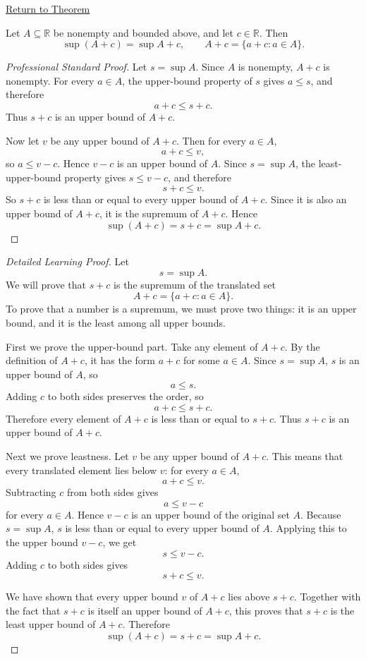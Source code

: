 \newpage
{}
\label{prf:translation-invariance-supremum}

\begin{remark*}[Return]
\hyperref[thm:translation-invariance-supremum]{Return to Theorem}
\end{remark*}

\begin{theorem*}
Let $A\subseteq\mathbb{R}$ be nonempty and bounded above, and let $c\in\mathbb{R}$. Then
\[
  \sup(A+c)=\sup A+c,
  \qquad
  A+c=\{a+c:a\in A\}.
\]
\end{theorem*}

\begin{proof}[Professional Standard Proof]
\LRAProofBodyStart
Let \(s=\sup A\). Since \(A\) is nonempty, \(A+c\) is nonempty. For every
\(a\in A\), the upper-bound property of \(s\) gives \(a\le s\), and therefore
\[
  a+c\le s+c.
\]
Thus \(s+c\) is an upper bound of \(A+c\).

Now let \(v\) be any upper bound of \(A+c\). Then for every \(a\in A\),
\[
  a+c\le v,
\]
so \(a\le v-c\). Hence \(v-c\) is an upper bound of \(A\). Since \(s=\sup A\),
the least-upper-bound property gives \(s\le v-c\), and therefore
\[
  s+c\le v.
\]
So \(s+c\) is less than or equal to every upper bound of \(A+c\). Since it is
also an upper bound of \(A+c\), it is the supremum of \(A+c\). Hence
\[
  \sup(A+c)=s+c=\sup A+c.
\]
\end{proof}

\begin{proof}[Detailed Learning Proof]
\LRAProofBodyStart
Let
\[
  s=\sup A.
\]
We will prove that \(s+c\) is the supremum of the translated set
\[
  A+c=\{a+c:a\in A\}.
\]
To prove that a number is a supremum, we must prove two things: it is an upper
bound, and it is the least among all upper bounds.

First we prove the upper-bound part. Take any element of \(A+c\). By the
definition of \(A+c\), it has the form \(a+c\) for some \(a\in A\). Since
\(s=\sup A\), \(s\) is an upper bound of \(A\), so
\[
  a\le s.
\]
Adding \(c\) to both sides preserves the order, so
\[
  a+c\le s+c.
\]
Therefore every element of \(A+c\) is less than or equal to \(s+c\). Thus
\(s+c\) is an upper bound of \(A+c\).

Next we prove leastness. Let \(v\) be any upper bound of \(A+c\). This means
that every translated element lies below \(v\): for every \(a\in A\),
\[
  a+c\le v.
\]
Subtracting \(c\) from both sides gives
\[
  a\le v-c
\]
for every \(a\in A\). Hence \(v-c\) is an upper bound of the original set
\(A\). Because \(s=\sup A\), \(s\) is less than or equal to every upper bound
of \(A\). Applying this to the upper bound \(v-c\), we get
\[
  s\le v-c.
\]
Adding \(c\) to both sides gives
\[
  s+c\le v.
\]

We have shown that every upper bound \(v\) of \(A+c\) lies above \(s+c\).
Together with the fact that \(s+c\) is itself an upper bound of \(A+c\), this
proves that \(s+c\) is the least upper bound of \(A+c\). Therefore
\[
  \sup(A+c)=s+c=\sup A+c.
\]
\end{proof}

